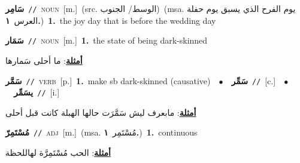 \documentclass[10pt,a4paper,twoside]{article} %
\begin{document}
\begin{multicols}{2}
{\setlength\topsep{0pt}\textbf{\foreignlanguage{arabic}{سَامِر}}\ {\color{gray}\texttt{//}\color{black}}\ \textsc{noun}\ [m.]\ (src. \color{gray}\foreignlanguage{arabic}{الوسط/ الجنوب}\color{black})\ \color{gray}(msa. \foreignlanguage{arabic}{يوم الفرح الذي يسبق يوم حفلة العرس}~\foreignlanguage{arabic}{\textbf{١.}})\color{black}\ \textbf{1.}~the joy day that is before the wedding day\ } \vspace{2mm}

{\setlength\topsep{0pt}\textbf{\foreignlanguage{arabic}{سَمَار}}\ {\color{gray}\texttt{//}\color{black}}\ \textsc{noun}\ [m.]\ \textbf{1.}~the state of being dark-skinned\  \begin{flushright}\color{gray}\foreignlanguage{arabic}{\textbf{\underline{\foreignlanguage{arabic}{أمثلة}}}: ما أحلى سَمارها}\end{flushright}\color{black}} \vspace{2mm}

{\setlength\topsep{0pt}\textbf{\foreignlanguage{arabic}{سَمَّر}}\ {\color{gray}\texttt{//}\color{black}}\ \textsc{verb}\ [p.]\ \textbf{1.}~make sb dark-skinned (causative)\ \ $\bullet$\ \ \setlength\topsep{0pt}\textbf{\foreignlanguage{arabic}{سَمِّر}}\ {\color{gray}\texttt{//}\color{black}}\ [c.]\ \ $\bullet$\ \ \setlength\topsep{0pt}\textbf{\foreignlanguage{arabic}{يسَمِّر}}\ {\color{gray}\texttt{//}\color{black}}\ [i.]\  \begin{flushright}\color{gray}\foreignlanguage{arabic}{\textbf{\underline{\foreignlanguage{arabic}{أمثلة}}}: مابعرف ليش سَمَّرَت حالها الهبلة كانت قبل أحلى}\end{flushright}\color{black}} \vspace{2mm}

{\setlength\topsep{0pt}\textbf{\foreignlanguage{arabic}{مُسْتَمِرّ}}\ {\color{gray}\texttt{//}\color{black}}\ \textsc{adj}\ [m.]\ \color{gray}(msa. \foreignlanguage{arabic}{مُسْتَمِر}~\foreignlanguage{arabic}{\textbf{١.}})\color{black}\ \textbf{1.}~continuous\  \begin{flushright}\color{gray}\foreignlanguage{arabic}{\textbf{\underline{\foreignlanguage{arabic}{أمثلة}}}: الحب مُسْتَمِرَّة لهاللحظة}\end{flushright}\color{black}} \vspace{2mm}


\end{multicols}
\end{document}
